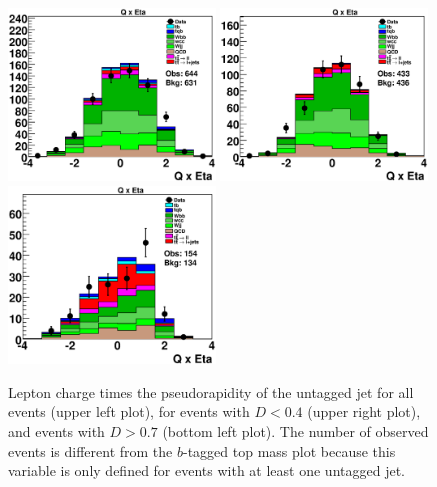 \begin{figure}[!h!tbp]
\includegraphics[width=0.49\textwidth]
{eps/MatrixElement/topovars/QTimesEta_0.eps}
\includegraphics[width=0.49\textwidth]
{eps/MatrixElement/topovars/QTimesEta_-0.4.eps}
\includegraphics[width=0.49\textwidth]
{eps/MatrixElement/topovars/QTimesEta_0.7.eps}
\vspace{-0.1in}
\caption{Lepton charge times the pseudorapidity of the untagged
jet for all events (upper left plot), for events with $D < 0.4$ (upper right
plot), and events with $D > 0.7$ (bottom left plot). The number of observed
events is different from the $b$-tagged top mass plot because this
variable is only defined for events with at least one untagged jet.}
\label{q-eta}
\end{figure}
